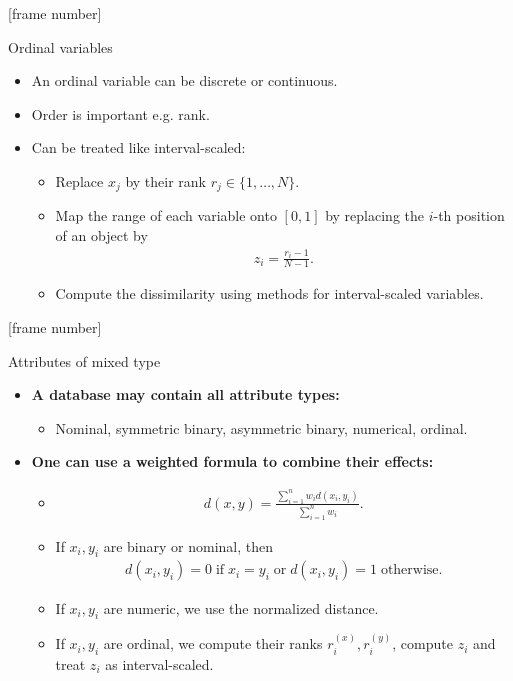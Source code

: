 \documentclass[aspectratio=169,t]{beamer}
\begin{document}
  {
    [frame number]
    \begin{frame}{Ordinal variables}
    \begin{itemize}
      \item An ordinal variable can be discrete or continuous.
      \item Order is important e.g. rank.
      \item Can be treated like interval-scaled:
      \begin{itemize}
        \item Replace $x_j$ by their rank $r_j \in \{1, \ldots, N \}$.
        \item Map the range of each variable onto $[0,1]$ by replacing the $i$-th position of an object by
        \begin{align}
        z_{i} = \frac{r_{i}-1}{N-1}.
        \end{align}
        \item Compute the dissimilarity using methods for interval-scaled variables.
      \end{itemize}
    \end{itemize}
    \end{frame}
  }

  {
    [frame number]
    \begin{frame}{Attributes of mixed type}
    \begin{itemize}
      \item \textbf{A database may contain all attribute types:}
      \begin{itemize}
          \item Nominal, symmetric binary, asymmetric binary, numerical, ordinal.
      \end{itemize}
      \item \textbf{One can use a weighted formula to combine their effects:}
      \begin{itemize}
        \item \begin{align}
          d(x,y) = \frac{\sum_{i=1}^{n} w_{i}d(x_i,y_i)}{\sum_{i=1}^{n} w_i}.
        \end{align}
        \item If $x_i,y_i$ are binary or nominal, then
        \begin{align}
          d(x_i,y_i) = 0 \; \text{if} \; x_i = y_i \; \text{or} \; d(x_i,y_i) = 1 \; \text{otherwise}.
        \end{align}
        \item If $x_i,y_i$ are numeric, we use the normalized distance.
        \item If $x_i,y_i$ are ordinal, we compute their ranks $r^{(x)}_i,r^{(y)}_i$, compute $z_i$ and treat $z_i$ as interval-scaled.
      \end{itemize}
    \end{itemize}
    \end{frame}
  }
\end{document}
